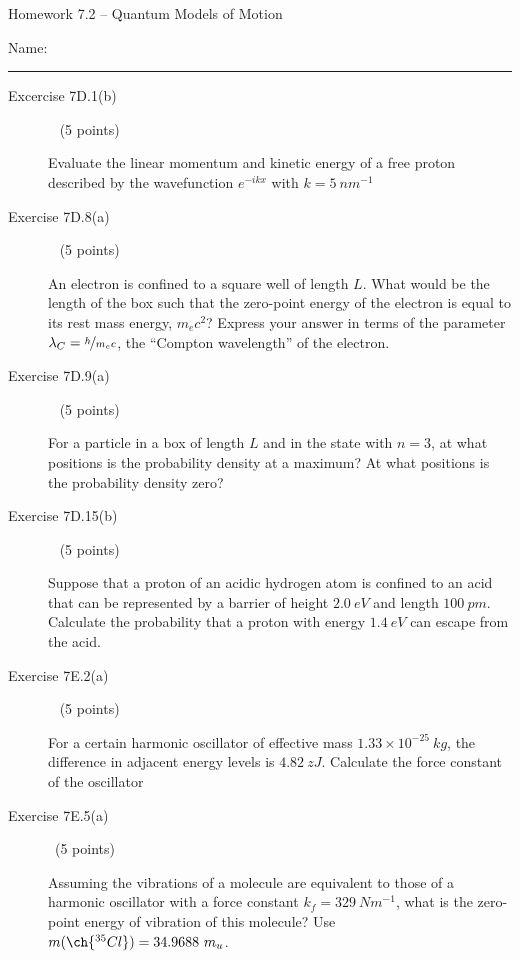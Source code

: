 \documentclass[10pt, letterpaper]{memoir}
\begin{document}
\begin{center}
	{\large Homework 7.2 -- Quantum Models of Motion}
\end{center}

Name: \rule[-.1mm]{15em}{0.1pt}

\begin{description}
	\item [Excercise 7D.1(b)] ~ (5 points)
	
	Evaluate the linear momentum and kinetic energy of a free proton described by the wavefunction $e^{-ikx}$ with $k=5~nm^{-1}$
	
	\vspace{5em}
	\item [Exercise 7D.8(a)] ~ (5 points)
	
	An electron is confined to a square well of length $L$. What would be the length of the box such that the zero-point energy of the electron is equal to its rest mass energy, $m_ec^2$? Express your answer in terms of the parameter $\lambda_C=\nicefrac{h}{m_ec}$, the ``Compton wavelength'' of the electron.
	
	\vspace{5em}
	\item [Exercise 7D.9(a)] ~ (5 points)
	
	For a particle in a box of length $L$  and in the state with $n=3$, at what positions is the probability density at a maximum? At what positions is the probability density zero?
	
	\vspace{5em}	
	\item [Exercise 7D.15(b)] ~ (5 points)
	
	Suppose that a proton of an acidic hydrogen atom is confined to an acid that can be represented by a barrier of height $2.0~eV$ and length $100~pm$. Calculate the probability that a proton with energy $1.4~eV$ can escape from the acid.

	\vspace{5em}	
	\item [Exercise 7E.2(a)] ~ (5 points)
	
	For a certain harmonic oscillator of effective mass $1.33\times10^{-25}~kg$, the difference in adjacent energy levels is $4.82~zJ$. Calculate the force constant of the oscillator
	
	\vspace{5em}
	\item [Exercise 7E.5(a)] ~(5 points)
	
	Assuming the vibrations of a  molecule are equivalent to those of a harmonic oscillator with a force constant $k_f=329~Nm^{-1}$, what is the zero-point energy of vibration of this molecule? Use $m(\ch{^{35}Cl})=34.9688~m_u$.
	

\end{description}
\end{document}
